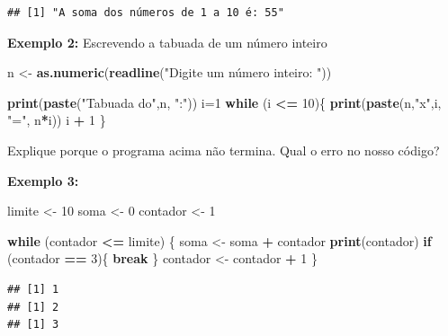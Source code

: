 \documentclass[
]{book}
\newenvironment{Shaded}{\begin{snugshade}}{\end{snugshade}}
\newcommand{\ControlFlowTok}[1]{\textcolor[rgb]{0.13,0.29,0.53}{\textbf{#1}}}
\newcommand{\DecValTok}[1]{\textcolor[rgb]{0.00,0.00,0.81}{#1}}
\newcommand{\FunctionTok}[1]{\textcolor[rgb]{0.13,0.29,0.53}{\textbf{#1}}}
\newcommand{\NormalTok}[1]{#1}
\newcommand{\OtherTok}[1]{\textcolor[rgb]{0.56,0.35,0.01}{#1}}
\newcommand{\SpecialCharTok}[1]{\textcolor[rgb]{0.81,0.36,0.00}{\textbf{#1}}}
\newcommand{\StringTok}[1]{\textcolor[rgb]{0.31,0.60,0.02}{#1}}
\begin{document}
\begin{verbatim}
## [1] "A soma dos números de 1 a 10 é: 55"
\end{verbatim}

\textbf{Exemplo 2:} Escrevendo a tabuada de um número inteiro

\begin{Shaded}
\begin{Highlighting}[]
\NormalTok{n }\OtherTok{\textless{}{-}} \FunctionTok{as.numeric}\NormalTok{(}\FunctionTok{readline}\NormalTok{(}\StringTok{"Digite um número inteiro: "}\NormalTok{))}

\FunctionTok{print}\NormalTok{(}\FunctionTok{paste}\NormalTok{(}\StringTok{"Tabuada do"}\NormalTok{,n, }\StringTok{":"}\NormalTok{))}
\NormalTok{i}\OtherTok{=}\DecValTok{1}
\ControlFlowTok{while}\NormalTok{ (i }\SpecialCharTok{\textless{}=} \DecValTok{10}\NormalTok{)\{  }
  \FunctionTok{print}\NormalTok{(}\FunctionTok{paste}\NormalTok{(n,}\StringTok{"x"}\NormalTok{,i, }\StringTok{"="}\NormalTok{, n}\SpecialCharTok{*}\NormalTok{i))  }
\NormalTok{  i }\SpecialCharTok{+} \DecValTok{1}
\NormalTok{\}}
\end{Highlighting}
\end{Shaded}

Explique porque o programa acima não termina. Qual o erro no nosso código?

\textbf{Exemplo 3:}

\begin{Shaded}
\begin{Highlighting}[]
\NormalTok{limite }\OtherTok{\textless{}{-}} \DecValTok{10}
\NormalTok{soma }\OtherTok{\textless{}{-}} \DecValTok{0}
\NormalTok{contador }\OtherTok{\textless{}{-}} \DecValTok{1}

\ControlFlowTok{while}\NormalTok{ (contador }\SpecialCharTok{\textless{}=}\NormalTok{ limite) \{  }
\NormalTok{  soma }\OtherTok{\textless{}{-}}\NormalTok{ soma }\SpecialCharTok{+}\NormalTok{ contador  }
  \FunctionTok{print}\NormalTok{(contador)  }
  \ControlFlowTok{if}\NormalTok{ (contador }\SpecialCharTok{==} \DecValTok{3}\NormalTok{)\{    }
    \ControlFlowTok{break}  
\NormalTok{  \}  }
\NormalTok{  contador }\OtherTok{\textless{}{-}}\NormalTok{ contador }\SpecialCharTok{+} \DecValTok{1}
\NormalTok{\}}
\end{Highlighting}
\end{Shaded}

\begin{verbatim}
## [1] 1
## [1] 2
## [1] 3
\end{verbatim}
\end{document}
